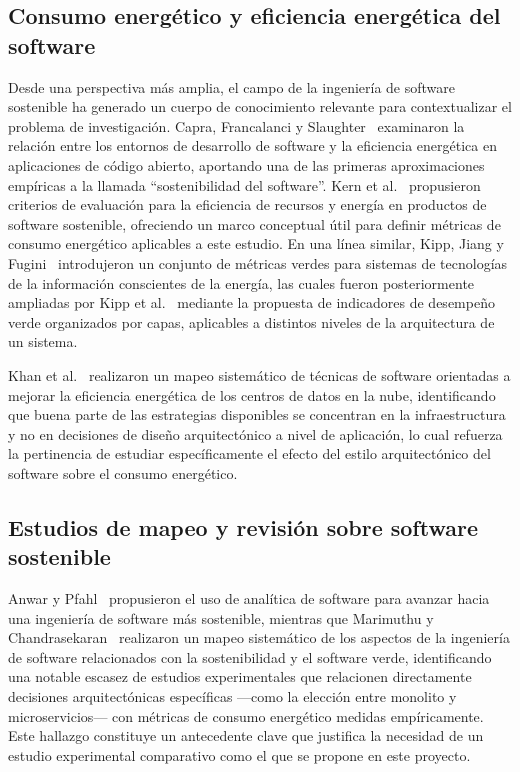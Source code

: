 \subsection{Consumo energético y eficiencia energética del software}

Desde una perspectiva más amplia, el campo de la ingeniería de software sostenible ha generado un cuerpo de conocimiento relevante para contextualizar el problema de investigación. Capra, Francalanci y Slaughter~\cite{capra2012green} examinaron la relación entre los entornos de desarrollo de software y la eficiencia energética en aplicaciones de código abierto, aportando una de las primeras aproximaciones empíricas a la llamada ``sostenibilidad del software''. Kern et al.~\cite{kern2018sustainable} propusieron criterios de evaluación para la eficiencia de recursos y energía en productos de software sostenible, ofreciendo un marco conceptual útil para definir métricas de consumo energético aplicables a este estudio. En una línea similar, Kipp, Jiang y Fugini~\cite{kipp2011green} introdujeron un conjunto de métricas verdes para sistemas de tecnologías de la información conscientes de la energía, las cuales fueron posteriormente ampliadas por Kipp et al.~\cite{kipp2012layered} mediante la propuesta de indicadores de desempeño verde organizados por capas, aplicables a distintos niveles de la arquitectura de un sistema.

Khan et al.~\cite{khan2020cloud} realizaron un mapeo sistemático de técnicas de software orientadas a mejorar la eficiencia energética de los centros de datos en la nube, identificando que buena parte de las estrategias disponibles se concentran en la infraestructura y no en decisiones de diseño arquitectónico a nivel de aplicación, lo cual refuerza la pertinencia de estudiar específicamente el efecto del estilo arquitectónico del software sobre el consumo energético.

\subsection{Estudios de mapeo y revisión sobre software sostenible}

Anwar y Pfahl~\cite{anwar2017towards} propusieron el uso de analítica de software para avanzar hacia una ingeniería de software más sostenible, mientras que Marimuthu y Chandrasekaran~\cite{marimuthu2017green} realizaron un mapeo sistemático de los aspectos de la ingeniería de software relacionados con la sostenibilidad y el software verde, identificando una notable escasez de estudios experimentales que relacionen directamente decisiones arquitectónicas específicas ---como la elección entre monolito y microservicios--- con métricas de consumo energético medidas empíricamente. Este hallazgo constituye un antecedente clave que justifica la necesidad de un estudio experimental comparativo como el que se propone en este proyecto.

